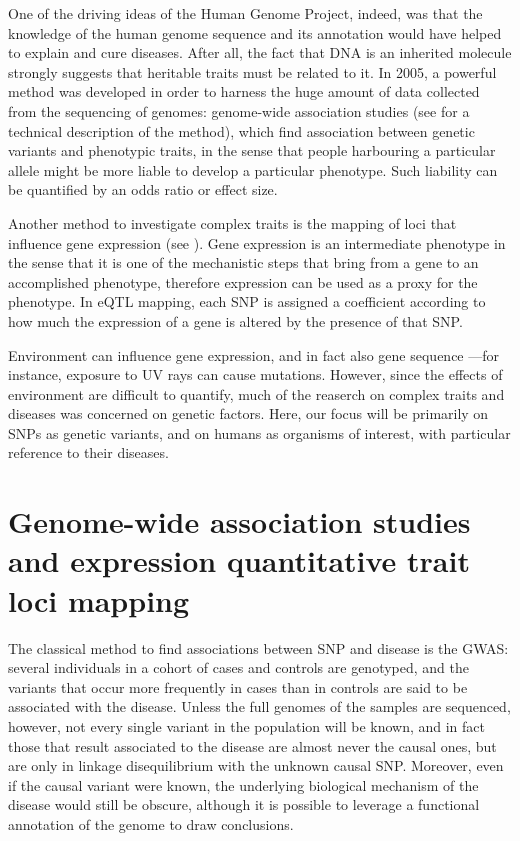 \documentclass[../main.tex]{subfiles}
\begin{document}
One of the driving ideas of the Human Genome 
Project\autocite{Lander2001,Venter2001}, indeed, was that the knowledge 
of the human genome sequence and its annotation would have helped to 
explain and cure diseases. After all, the fact that DNA is an inherited 
molecule strongly suggests that heritable traits must be related to it. 
In 2005, a powerful method was developed in order to harness the huge 
amount of data collected from the sequencing of genomes: genome-wide 
association studies (see  for a technical description of 
the method), which find association between genetic variants and 
phenotypic traits, in the sense that people harbouring a particular 
allele might be more liable to develop a particular phenotype. Such 
liability can be quantified by an odds ratio or effect size.

Another method to investigate complex traits is the mapping of loci that 
influence gene expression (see ). Gene expression is an 
intermediate phenotype in the sense that it is one of the mechanistic 
steps that bring from a gene to an accomplished phenotype, therefore 
expression can be used as a proxy for the phenotype. In eQTL mapping, 
each SNP is assigned a coefficient according to how much the expression 
of a gene is altered by the presence of that SNP.

Environment can influence gene expression, and in fact also gene 
sequence ---for instance, exposure to UV rays can cause mutations. 
However, since the effects of environment are difficult to quantify, 
much of the reaserch on complex traits and diseases was concerned on 
genetic factors. Here, our focus will be primarily on SNPs as genetic 
variants, and on humans as organisms of interest, with particular 
reference to their diseases.

\section{Genome-wide association studies and expression quantitative 
	trait loci mapping}


The classical method to find associations between SNP and disease is the 
GWAS: several individuals in a cohort of cases and controls are 
genotyped, and the variants that occur more frequently in cases than in 
controls are said to be associated with the disease. Unless the full 
genomes of the samples are sequenced, however, not every single variant 
in the population will be known, and in fact those that result 
associated to the disease are almost never the causal ones, but are only 
in linkage disequilibrium with the unknown causal 
SNP\autocite{Visscher2012}. Moreover, even if the causal variant were 
known, the underlying biological mechanism of the disease would still be 
obscure, although it is possible to leverage a functional annotation of 
the genome to draw conclusions.
\end{document}
